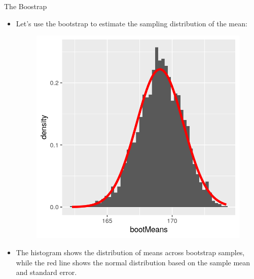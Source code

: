 \documentclass[handout]{beamer}
\begin{document}
\begin{frame}{The Boostrap}
\scriptsize{

\begin{itemize}
\item Let's use the bootstrap to estimate the sampling distribution of the mean:

\begin{figure}[h!]
	\centering
	\includegraphics[scale=0.5]{pics/bootstrapSEM-1.png}
\end{figure}

\item The histogram shows the distribution of means across bootstrap samples, while the red line shows the normal distribution based on the sample mean and standard error. 

\end{itemize}
}
 
\end{frame}
\end{document}
